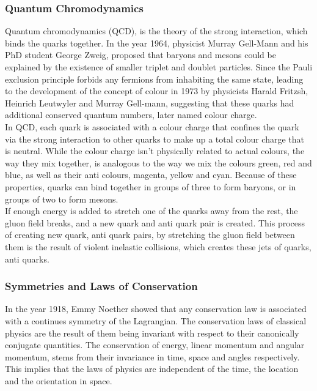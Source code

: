 \documentclass[12pt,a4paper]{article}
\numberwithin{equation}{section}
\begin{document}
\subsubsection{Quantum Chromodynamics}
Quantum chromodynamics (QCD), is the theory of the strong interaction, which
binds the quarks together. In the year 1964, physicist Murray Gell-Mann and his
PhD student George Zweig, proposed that baryons and mesons could be explained by
the existence of smaller triplet and doublet particles\cite{GELLMANN1964214}.
Since the Pauli exclusion principle forbids any fermions from inhabiting the
same state, leading to the development of the concept of colour in
1973\cite{FRITZSCH1973365} by physicists Harald Fritzsh, Heinrich Leutwyler and
Murray Gell-mann, suggesting that these quarks had additional conserved
quantum numbers, later named colour charge.\\

In QCD, each quark is associated with a colour charge that confines the quark via
the strong interaction to other quarks to make up a total colour charge that is
neutral. While the colour charge isn't physically related to actual colours, the
way they mix together, is analogous to the way we mix the colours green, red and
blue, as well as their anti colours, magenta, yellow and cyan. Because of these
properties, quarks can bind together in groups of three to form baryons, or in
groups of two to form mesons.\\

If enough energy is added to stretch one of the quarks away from the rest, the
gluon field breaks, and a new quark and anti quark pair is created. This process
of creating new quark, anti quark pairs, by stretching the gluon field between
them is the result of violent inelastic collisions, which creates these jets of
quarks, anti quarks.\\

\subsubsection{Symmetries and Laws of Conservation}
In the year 1918, Emmy Noether showed that any conservation law is associated
with a continues symmetry of the Lagrangian\cite{Noether_1971}. The
conservation laws of classical physics are the result of them being invariant
with respect to their canonically conjugate quantities. The conservation of
energy, linear momentum and angular momentum, stems from their invariance in
time, space and angles respectively. This implies that the laws of physics are
independent of the time, the location and the orientation in space.\\
\end{document}
